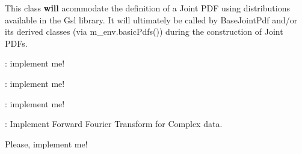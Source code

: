\begin{DoxyRefList}
\item[\label{todo__todo000003}%
\hypertarget{todo__todo000003}{}%
Class \hyperlink{class_q_u_e_s_o_1_1_basic_pdfs_gsl}{Q\-U\-E\-S\-O\-:\-:Basic\-Pdfs\-Gsl} ]This class {\bfseries will} acommodate the definition of a Joint P\-D\-F using distributions available in the Gsl library. It will ultimately be called by Base\-Joint\-Pdf and/or its derived classes (via m\-\_\-env.\-basic\-Pdfs()) during the construction of Joint P\-D\-Fs.  
\item[\label{todo__todo000014}%
\hypertarget{todo__todo000014}{}%
Member \hyperlink{class_q_u_e_s_o_1_1_bayesian_joint_pdf_a7e00d685068bcf34253e5a101b539261}{Q\-U\-E\-S\-O\-:\-:Bayesian\-Joint\-Pdf$<$ V, M $>$\-:\-:compute\-Log\-Of\-Normalization\-Factor} (unsigned int num\-Samples, bool update\-Factor\-Internally) const ]\-: implement me!  
\item[\label{todo__todo000015}%
\hypertarget{todo__todo000015}{}%
Member \hyperlink{class_q_u_e_s_o_1_1_beta_vector_r_v_ae54ad1998b22aed2f5c8061cd1ad56e5}{Q\-U\-E\-S\-O\-:\-:Beta\-Vector\-R\-V$<$ V, M $>$\-:\-:print} (std\-::ostream \&os) const ]\-: implement me!  
\item[\label{todo__todo000016}%
\hypertarget{todo__todo000016}{}%
Member \hyperlink{class_q_u_e_s_o_1_1_concatenated_vector_r_v_ac479f33e7ef6ff9f17b930aef13fcd7c}{Q\-U\-E\-S\-O\-:\-:Concatenated\-Vector\-R\-V$<$ V, M $>$\-:\-:print} (std\-::ostream \&os) const ]\-: implement me!  
\item[\label{todo__todo000012}%
\hypertarget{todo__todo000012}{}%
Class \hyperlink{class_q_u_e_s_o_1_1_fft}{Q\-U\-E\-S\-O\-:\-:Fft$<$ T $>$} ]\-: Implement Forward Fourier Transform for Complex data. 
\item[\label{todo__todo000007}%
\hypertarget{todo__todo000007}{}%
Member \hyperlink{class_q_u_e_s_o_1_1_func_plus_func1_d1_d_function_a37e3b0d0b5655b555cde6674e382a36e}{Q\-U\-E\-S\-O\-:\-:Func\-Plus\-Func1\-D1\-D\-Function\-:\-:deriv} (double domain\-Value) const ]Please, implement me! \par
  

\end{DoxyRefList}
